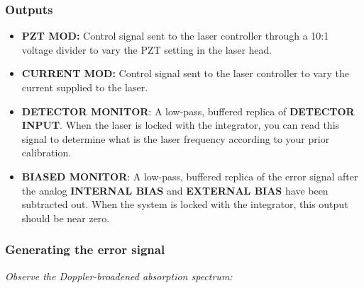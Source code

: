 \documentclass{../lab}
\begin{document}
\subsubsection{Outputs}

\begin{itemize}
    \item \textbf{PZT MOD:} Control signal sent to the laser controller through a 10:1 voltage divider to vary the PZT setting in the laser head.

    \item \textbf{CURRENT MOD:} Control signal sent to the laser controller to vary the current supplied to the laser.

    \item \textbf{DETECTOR MONITOR}: A low-pass, buffered replica of \textbf{DETECTOR INPUT}. When the laser is locked with the integrator, you can read this signal to determine what is the laser frequency according to your prior calibration.

    \item \textbf{BIASED MONITOR}: A low-pass, buffered replica of the error signal after the analog \textbf{INTERNAL BIAS} and \textbf{EXTERNAL BIAS} have been subtracted out. When the system is locked with the integrator, this output should be near zero.
\end{itemize}

\subsubsection{Generating the error signal}
\label{sec:generating_error_signal}

\emph{Observe the Doppler-broadened absorption spectrum:}
\end{document}
